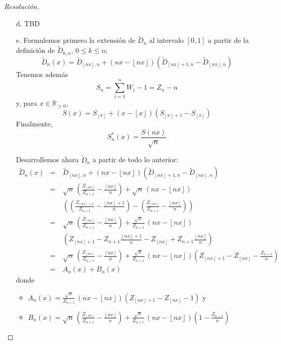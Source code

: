 \documentclass[a4paper,11pt]{article}
\newcommand{\Sst}[1]{S_n^{*}(#1)}
\newcommand{\floor}[1]{\left\lfloor #1 \right\rfloor}
\newcommand{\Dn}[1]{\tilde{D}_{#1 ,n}}
\newcommand{\fnx}{\floor{nx}}
\newcommand{\fnxp}{\floor{nx}+1}
\begin{document}
\begin{proof}[Resoluci\'on]
$ $ 
\begin{enumerate}
    \item[d.] TBD

    \item[e.] Formulemos primero la extensión de $\tilde{D}_n$ al intervalo $[0,1]$
    a partir de la definición de $\Dn{k}$, $0 \leq k \leq n$:
    $$\tilde{D}_n(x) = \Dn{\floor{nx}} + (nx - \floor{nx}) (\Dn{\floor{nx} + 1} - \Dn{\floor{nx}})$$
    Tenemos además
    $$S_n = \sum_{i = 1}^{n}{W_i - 1} = Z_n - n$$
    y, para $x \in \mathbb{R}_{\geq 0}$,
    $$S(x) = S_{\floor{x}} + (x - \floor{x}) (S_{\floor{x}+1} - S_{\floor{x}})$$
    Finalmente,
    $$\Sst{x} = \frac{S(nx)}{\sqrt{n}}$$

    Desarrollemos ahora $\tilde{D}_n$ a partir de todo lo anterior:
    \begin{eqnarray*}
        \tilde{D}_n(x)
            &=& \Dn{\floor{nx}} + (nx - \floor{nx}) \left(\Dn{\floor{nx} + 1} - \Dn{\floor{nx}}\right) \\
            &=& \sqrt{n} \, \left(\frac{Z_{\fnx}}{Z_{n+1}} − \frac{\fnx}{n} \right) + \sqrt{n} \, (nx - \floor{nx}) \\
            &\quad&  \left(\left(\frac{Z_{\fnxp}}{Z_{n+1}} − \frac{\fnxp}{n}\right) - \left(\frac{Z_{\fnx}}{Z_{n+1}} − \frac{\fnx}{n}\right)\right) \\
            &=& \sqrt{n} \, \left(\frac{Z_{\fnx}}{Z_{n+1}} − \frac{\fnx}{n} \right) + \frac{\sqrt{n}}{Z_{n+1}} \, (nx - \floor{nx}) \\
            &\quad&  \left(Z_{\fnxp} − Z_{n+1} \frac{\fnxp}{n} - Z_{\fnx} + Z_{n+1} \frac{\fnx}{n} \right) \\
            &=& \sqrt{n} \, \left(\frac{Z_{\fnx}}{Z_{n+1}} − \frac{\fnx}{n} \right) + \frac{\sqrt{n}}{Z_{n+1}} \, (nx - \floor{nx}) 
                \left(Z_{\fnxp} - Z_{\fnx} - \frac{Z_{n+1}}{n} \right) \\
            &=& A_n(x) + B_n(x)
    \end{eqnarray*}
    donde
    \begin{itemize}
        \item $A_n(x) = \frac{\sqrt{n}}{Z_{n+1}} \, (nx - \floor{nx})  \left(Z_{\fnxp} - Z_{\fnx} - 1 \right)$ y
        \item $B_n(x) =  \sqrt{n} \, \left(\frac{Z_{\fnx}}{Z_{n+1}} − \frac{\fnx}{n} \right) + \frac{\sqrt{n}}{Z_{n+1}} \, (nx - \floor{nx}) \left(1 - \frac{Z_{n+1}}{n}\right)$
    \end{itemize}


\end{enumerate}
\end{proof}
\end{document}
